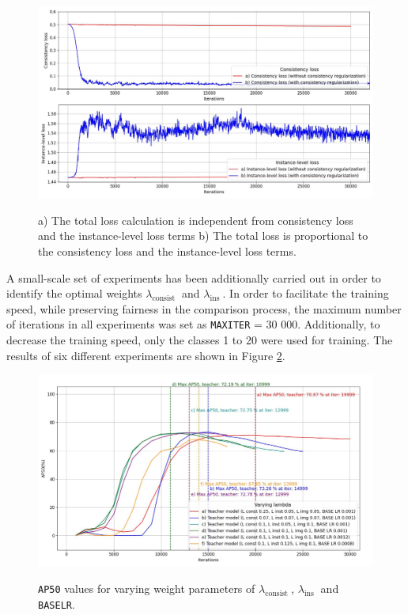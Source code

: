 \begin{figure}[htb]
	\begin{center}
		\includegraphics[width=14cm]{./consistency_loss.jpg}
	\end{center}
	\caption{a) The total loss calculation is independent from consistency loss and the instance-level loss terms b) The total loss is proportional to the consistency loss and the instance-level loss terms.}
	\begin{center}
		\label{myModel_constloss_total}
	\end{center}
\end{figure}

A small-scale set of experiments has been additionally carried out in order to identify the optimal weights $\lambda_{\text {consist }}$ and $\lambda_{\text {ins }}$. In order to facilitate the training speed, while preserving fairness in the  comparison process, the maximum number of iterations in all experiments was set as \texttt{MAX\textunderscore ITER} = 30 000. Additionally, to decrease the training speed, only the classes 1 to 20 were used for training. The results of six different experiments are shown in Figure \ref{myModel_varying_params}.

\begin{figure}[htb]
	\begin{center}
		\includegraphics[width=14cm]{./AP50_varying_lambda.jpg}
	\end{center}
	\caption{\texttt{AP50} values for varying weight parameters of $\lambda_{\text {consist }}$, $\lambda_{\text {ins }}$ and \texttt{BASE\textunderscore LR}.}
	\begin{center}
		\label{myModel_varying_params}
	\end{center}
\end{figure}
\FloatBarrier  

